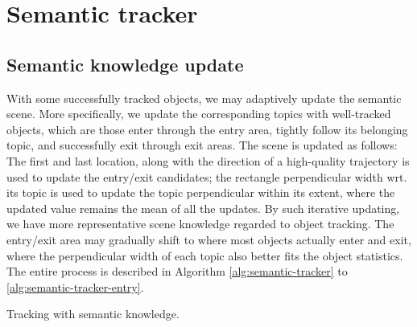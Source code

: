 \section{Semantic tracker}

\subsection{Semantic knowledge update}
With some successfully tracked objects, we may adaptively update the semantic scene. 
More specifically, we update the corresponding topics with well-tracked objects, which are those enter through the entry area, tightly follow its belonging topic, and successfully exit through exit areas. 
The scene is updated as follows: 
The first and last location, along with the direction of a high-quality trajectory is used to update the entry/exit candidates; the rectangle perpendicular width wrt. its topic is used to update the topic perpendicular within its extent, where the updated value remains the mean of all the updates.
By such iterative updating, we have more representative scene knowledge regarded to object tracking. The entry/exit area may gradually shift to where most objects actually enter and exit, where the perpendicular width of each topic also better fits the object statistics. The entire process is described in Algorithm \ref{alg:semantic-tracker} to \ref{alg:semantic-tracker-entry}.

\begin{algorithm}
 \caption{Tracking with semantic knowledge.}
 \label{alg:semantic-tracker}
\end{algorithm}

